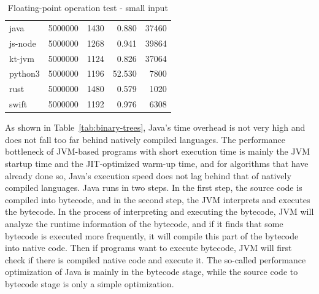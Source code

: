 \begin{table}[htbp]
\begin{subtable}[h]{0.495\linewidth}
\begin{tabular}{lrrrr}
            java      & 5000000 & 1430    & 0.880  & 37460   \\
            js-node   & 5000000 & 1268    & 0.941  & 39864   \\
            kt-jvm    & 5000000 & 1124    & 0.826  & 37064   \\
            python3   & 5000000 & 1196    & 52.530 & 7800    \\
            rust      & 5000000 & 1480    & 0.579  & 1020    \\
            swift     & 5000000 & 1192    & 0.976  & 6308    \\
            \bottomrule
        \end{tabular}
        \caption{Floating-point operation test - small input}
        \label{tab:n-body-2}
    \end{subtable}
\end{table}

As shown in Table~\ref{tab:binary-trees},
Java's time overhead is not very high and does not fall too far behind natively compiled languages.
The performance bottleneck of JVM-based programs with short execution time is mainly the JVM startup
time and the JIT-optimized warm-up time, and for algorithms that have already done so,
Java's execution speed does not lag behind that of natively compiled languages.
Java runs in two steps.
In the first step, the source code is compiled into bytecode, and in the second step,
the JVM interprets and executes the bytecode.
In the process of interpreting and executing the bytecode, JVM will analyze the runtime
information of the bytecode, and if it finds that some bytecode is executed more frequently,
it will compile this part of the bytecode into native code.
Then if programs want to execute bytecode, JVM will first check if there is compiled native code and execute it.
The so-called performance optimization of Java is mainly in the bytecode stage,
while the source code to bytecode stage is only a simple optimization.

